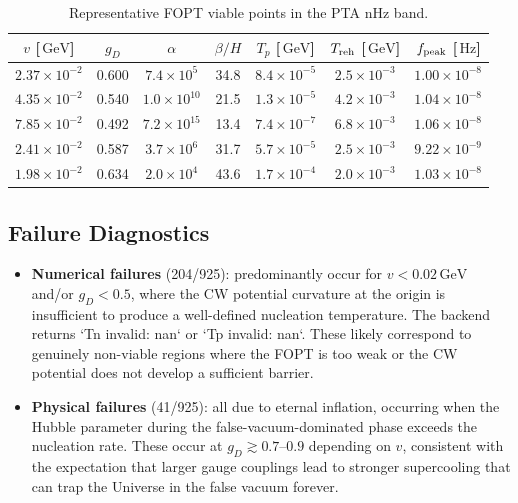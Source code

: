 \documentclass[a4paper,11pt]{article}
\newcommand{\GeV}{\,\text{GeV}}
\newcommand{\Hz}{\,\text{Hz}}
\begin{document}
\begin{table}[htbp]
\centering
\caption{Representative FOPT viable points in the PTA nHz band.}
\label{tab:fopt_benchmarks}
\begin{tabular}{ccccccc}
\toprule
$v$ [$\GeV$] & $g_D$ & $\alpha$ & $\beta/H$ & $T_p$ [$\GeV$] & $T_{\rm reh}$ [$\GeV$] & $f_{\rm peak}$ [$\Hz$] \\
\midrule
$2.37\times10^{-2}$ & 0.600 & $7.4\times10^5$ & 34.8 & $8.4\times10^{-5}$ & $2.5\times10^{-3}$ & $1.00\times10^{-8}$ \\
$4.35\times10^{-2}$ & 0.540 & $1.0\times10^{10}$ & 21.5 & $1.3\times10^{-5}$ & $4.2\times10^{-3}$ & $1.04\times10^{-8}$ \\
$7.85\times10^{-2}$ & 0.492 & $7.2\times10^{15}$ & 13.4 & $7.4\times10^{-7}$ & $6.8\times10^{-3}$ & $1.06\times10^{-8}$ \\
$2.41\times10^{-2}$ & 0.587 & $3.7\times10^6$ & 31.7 & $5.7\times10^{-5}$ & $2.5\times10^{-3}$ & $9.22\times10^{-9}$ \\
$1.98\times10^{-2}$ & 0.634 & $2.0\times10^4$ & 43.6 & $1.7\times10^{-4}$ & $2.0\times10^{-3}$ & $1.03\times10^{-8}$ \\
\bottomrule
\end{tabular}
\end{table}

\subsection{Failure Diagnostics}

\begin{itemize}
\item \textbf{Numerical failures} (204/925): predominantly occur for $v < 0.02\GeV$ and/or $g_D < 0.5$, where the CW potential curvature at the origin is insufficient to produce a well-defined nucleation temperature. The backend returns `Tn invalid: nan` or `Tp invalid: nan`. These likely correspond to genuinely non-viable regions where the FOPT is too weak or the CW potential does not develop a sufficient barrier.
\item \textbf{Physical failures} (41/925): all due to eternal inflation, occurring when the Hubble parameter during the false-vacuum-dominated phase exceeds the nucleation rate. These occur at $g_D \gtrsim 0.7$--$0.9$ depending on $v$, consistent with the expectation that larger gauge couplings lead to stronger supercooling that can trap the Universe in the false vacuum forever.
\end{itemize}
\end{document}
